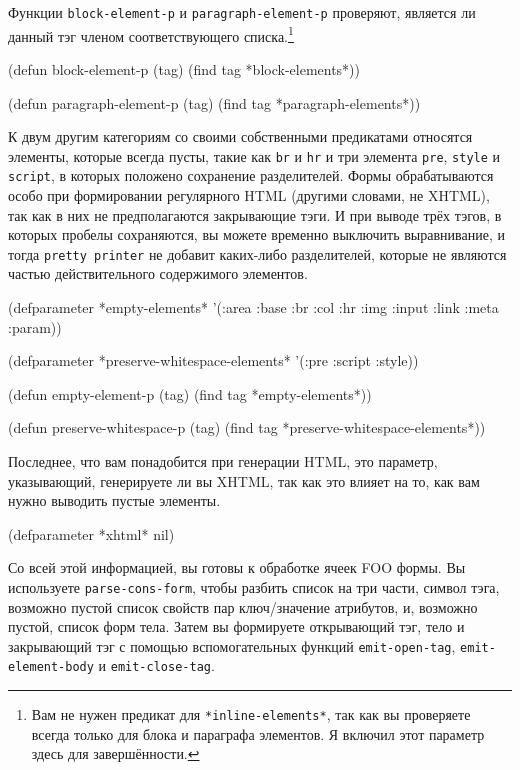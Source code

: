 Функции \lstinline{block-element-p} и \lstinline{paragraph-element-p} проверяют, является ли данный
тэг членом соответствующего списка.\footnote{Вам не нужен предикат для
  \lstinline{*inline-elements*}, так как вы проверяете всегда только для блока и параграфа
  элементов. Я включил этот параметр здесь для завершённости.}

\begin{myverb}
(defun block-element-p (tag) (find tag *block-elements*))

(defun paragraph-element-p (tag) (find tag *paragraph-elements*))
\end{myverb}

К двум другим категориям со своими собственными предикатами относятся элементы, которые
всегда пусты, такие как \lstinline{br} и \lstinline{hr} и три элемента \lstinline{pre}, \lstinline{style} и
\lstinline{script}, в которых положено сохранение разделителей. Формы обрабатываются особо при
формировании регулярного HTML (другими словами, не XHTML), так как в них не предполагаются
закрывающие тэги. И при выводе трёх тэгов, в которых пробелы сохраняются, вы можете
временно выключить выравнивание, и тогда \lstinline{pretty printer} не добавит каких-либо
разделителей, которые не являются частью действительного содержимого элементов.

\begin{myverb}
(defparameter *empty-elements*
  '(:area :base :br :col :hr :img :input :link :meta :param))

(defparameter *preserve-whitespace-elements* '(:pre :script :style))

(defun empty-element-p (tag) (find tag *empty-elements*))

(defun preserve-whitespace-p (tag) (find tag *preserve-whitespace-elements*))
\end{myverb}

Последнее, что вам понадобится при генерации HTML, это параметр, указывающий, генерируете
ли вы XHTML, так как это влияет на то, как вам нужно выводить пустые элементы.

\begin{myverb}
(defparameter *xhtml* nil)
\end{myverb}

Со всей этой информацией, вы готовы к обработке ячеек FOO формы. Вы используете
\lstinline{parse-cons-form}, чтобы разбить список на три части, символ тэга, возможно пустой
список свойств пар ключ/значение атрибутов, и, возможно пустой, список форм тела. Затем вы
формируете открывающий тэг, тело и закрывающий тэг с помощью вспомогательных функций
\lstinline{emit-open-tag}, \lstinline{emit-element-body} и \lstinline{emit-close-tag}.

